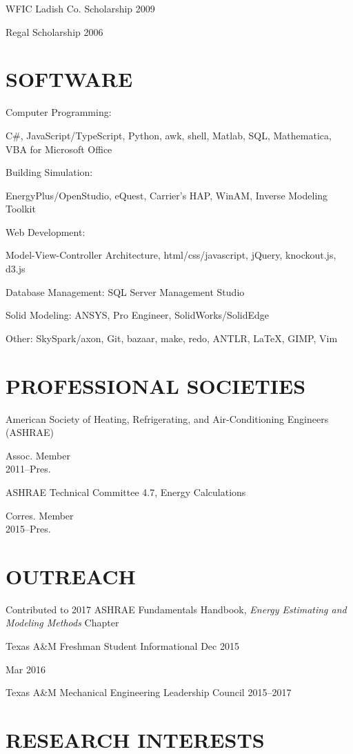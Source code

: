 \documentclass[margin]{res} %
\begin{document}
\begin{resume}
WFIC Ladish Co. Scholarship \hfill 2009

Regal Scholarship \hfill 2006

\section{SOFTWARE}

Computer Programming: \parbox[t]{9cm}{C\#, JavaScript/TypeScript, Python, awk, shell, Matlab, SQL, Mathematica, VBA for Microsoft Office}

Building Simulation: \parbox[t]{10cm}{EnergyPlus/OpenStudio, eQuest, Carrier's
HAP, WinAM, Inverse Modeling Toolkit}

Web Development: \parbox[t]{10cm}{Model-View-Controller Architecture,
html/css/javascript, jQuery, knockout.js, d3.js}

Database Management: SQL Server Management Studio

Solid Modeling: ANSYS, Pro Engineer, SolidWorks/SolidEdge

Other: SkySpark/axon, Git, bazaar, make, redo, ANTLR, \LaTeX, GIMP, Vim

\section{PROFESSIONAL SOCIETIES}

\parbox[t]{9cm}{American Society of Heating, Refrigerating, and Air-Conditioning Engineers (ASHRAE)} \hfill \parbox[t]{3cm}{\raggedleft  Assoc. Member \\ 2011--Pres.}

\parbox[t]{9cm}{ASHRAE Technical Committee 4.7, Energy Calculations }\hfill \parbox[t]{3cm}{\raggedleft Corres. Member \\ 2015--Pres.}

\section{OUTREACH}
\parbox[t]{10cm}{Contributed to 2017 ASHRAE Fundamentals Handbook, \textit{Energy Estimating and Modeling Methods} Chapter}

Texas A\&M Freshman Student Informational \hfill Dec 2015\\
\strut \hfill Mar 2016

Texas A\&M Mechanical Engineering Leadership Council \hfill 2015--2017

\section{RESEARCH INTERESTS}


\end{resume}
\end{document}
